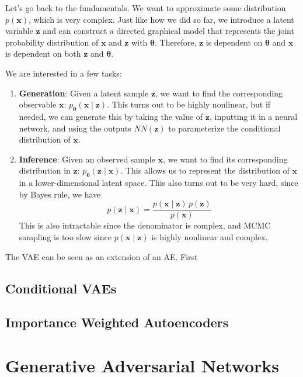 \documentclass{article}
\theoremstyle{definition}
\theoremstyle{remark}
\theoremstyle{definition}
\begin{document}
Let's go back to the fundamentals. We want to approximate some distribution $p(\mathbf{x})$, which is very complex. Just like how we did so far, we introduce a latent variable $\mathbf{z}$ and can construct a directed graphical model that represents the joint probability distribution of $\mathbf{x}$ and $\mathbf{z}$ with $\boldsymbol{\theta}$. Therefore, $\mathbf{z}$ is dependent on $\boldsymbol{\theta}$ and $\mathbf{x}$ is dependent on both $\mathbf{z}$ and $\boldsymbol{\theta}$. 
\begin{center}

\end{center}
We are interested in a few tasks: 
\begin{enumerate}
    \item \textbf{Generation}: Given a latent sample $\mathbf{z}$, we want to find the corresponding observable $\mathbf{x}$: $p_{\boldsymbol{\theta}} (\mathbf{x} \mid \mathbf{z})$. This turns out to be highly nonlinear, but if needed, we can generate this by taking the value of $\mathbf{z}$, inputting it in a neural network, and using the outputs $NN(\mathbf{z})$ to parameterize the conditional distribution of $\mathbf{x}$. 

    \item \textbf{Inference}: Given an observed sample $\mathbf{x}$, we want to find its corresponding distribution in $\mathbf{z}$: $p_{\boldsymbol{\theta}} (\mathbf{z} \mid \mathbf{x})$. This allows us to represent the distribution of $\mathbf{x}$ in a lower-dimensional latent space. This also turns out to be very hard, since by Bayes rule, we have 
    \[p(\mathbf{z} \mid \mathbf{x}) = \frac{p(\mathbf{x} \mid \mathbf{z}) \, p(\mathbf{z})}{p(\mathbf{x})}\]
    This is also intractable since the denominator is complex, and MCMC sampling is too slow since $p(\mathbf{x} \mid \mathbf{z})$ is highly nonlinear and complex. 
\end{enumerate}


The VAE can be seen as an extension of an AE. First

\subsection{Conditional VAEs}

\subsection{Importance Weighted Autoencoders}


\section{Generative Adversarial Networks}
\end{document}
